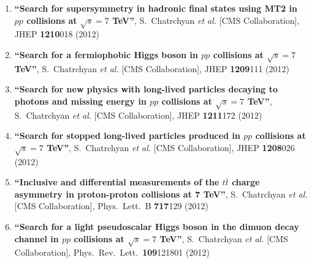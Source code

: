 \begin{enumerate}
\item%
{\bf ``Search for supersymmetry in hadronic final states using MT2 in $pp$ collisions at $\sqrt{s} = 7$ TeV''}, 
  S.~Chatrchyan {\it et al.}  [CMS Collaboration], 
JHEP {\bf 1210}018 (2012) %


\item%
{\bf ``Search for a fermiophobic Higgs boson in $pp$ collisions at $\sqrt{s}=7$ TeV''}, 
  S.~Chatrchyan {\it et al.}  [CMS Collaboration], 
JHEP {\bf 1209}111 (2012) %


\item%
{\bf ``Search for new physics with long-lived particles decaying to photons and missing energy in $pp$ collisions at $\sqrt{s}=7$ TeV''}, 
  S.~Chatrchyan {\it et al.}  [CMS Collaboration], 
JHEP {\bf 1211}172 (2012) %


\item%
{\bf ``Search for stopped long-lived particles produced in $pp$ collisions at $\sqrt{s}=7$ TeV''}, 
  S.~Chatrchyan {\it et al.}  [CMS Collaboration], 
JHEP {\bf 1208}026 (2012) %


\item%
{\bf ``Inclusive and differential measurements of the $t \bar{t}$ charge asymmetry in proton-proton collisions at 7 TeV''}, 
  S.~Chatrchyan {\it et al.}  [CMS Collaboration], 
Phys.\ Lett.\ B {\bf 717}129 (2012) %


\item%
{\bf ``Search for a light pseudoscalar Higgs boson in the dimuon decay channel in $pp$ collisions at $\sqrt{s}=7$ TeV''}, 
  S.~Chatrchyan {\it et al.}  [CMS Collaboration], 
Phys.\ Rev.\ Lett.\  {\bf 109}121801 (2012) %



\end{enumerate}

